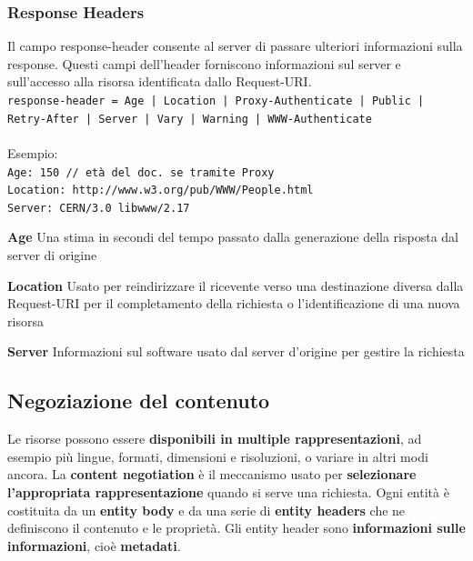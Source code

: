 \documentclass[10pt]{article}
\begin{document}
\subsubsection{Response Headers} Il campo response-header consente al server di passare ulteriori informazioni sulla response. Questi campi dell'header forniscono informazioni sul server e sull'accesso alla risorsa identificata dallo Request-URI.\\
\texttt{response-header = Age | Location | Proxy-Authenticate | Public | Retry-After | Server | Vary | Warning | WWW-Authenticate}\\\\Esempio:\\
\texttt{Age: 150 // età del doc. se tramite Proxy\\
Location: http://www.w3.org/pub/WWW/People.html\\
Server: CERN/3.0 libwww/2.17}
\begin{list}{}{}
\item \textbf{Age} Una stima in secondi del tempo passato dalla generazione della risposta dal server di origine
\item \textbf{Location} Usato per reindirizzare il ricevente verso una destinazione diversa dalla Request-URI per il completamento della richiesta o l'identificazione di una nuova risorsa
\item \textbf{Server} Informazioni sul software usato dal server d'origine per gestire la richiesta
\end{list}
\subsection{Negoziazione del contenuto}
Le risorse possono essere \textbf{disponibili in multiple rappresentazioni}, ad esempio più lingue, formati, dimensioni e risoluzioni, o variare in altri modi ancora. La \textbf{content negotiation} è il meccanismo usato per \textbf{selezionare l'appropriata rappresentazione} quando si serve una richiesta. Ogni entità è costituita da un \textbf{entity body} e da una serie di \textbf{entity headers} che ne definiscono il contenuto e le proprietà. Gli entity header sono \textbf{informazioni sulle informazioni}, cioè \textbf{metadati}.
\end{document}
